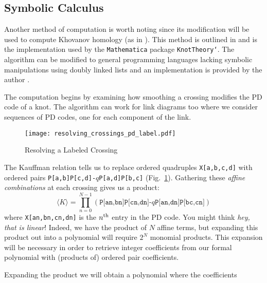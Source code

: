     \subsection{Symbolic Calculus}
        Another method of computation is worth noting since its modification
        will be used to compute Khovanov homology
        (as in \cite{BarNatan2006FASTKH}). This method is outlined in
        \cite{KatlasJones} and is the implementation used by the
        \texttt{Mathematica} package \texttt{KnotTheory`}. The algorithm
        can be modified to general programming languages lacking symbolic
        manipulations using doubly linked lists and an implementation
        is provided by the author \cite{MaguireJones}.
        \par\hfill\par
        The computation begins by examining how smoothing a crossing modifies
        the PD code of a knot. The algorithm can work for link diagrams too
        where we consider sequences of PD codes, one for each component of the
        link.
        \begin{figure}
            \centering
            \texttt{[image: resolving\_crossings\_pd\_label.pdf]}
            \caption{Resolving a Labeled Crossing}
            \label{fig:resolving_crossings_pd_label}
        \end{figure}
        The Kauffman relation tells us to replace ordered quadruples
        \texttt{X[a,b,c,d]} with ordered pairs
        \texttt{P[a,b]P[c,d]-$q$P[a,d]P[b,c]}
        (Fig.~\ref{fig:resolving_crossings_pd_label}).
        Gathering these \textit{affine combinations}
        at each crossing gives us a product:
        \begin{equation}
            \langle{K}\rangle
            =\prod_{n=0}^{N-1}(
                \texttt{P[an,bn]P[cn,dn]-$q$P[an,dn]P[bc,cn]}
            )
        \end{equation}
        where \texttt{X[an,bn,cn,dn]} is the
        $n^{\small\textrm{th}}$ entry in the PD code. You might think
        \textit{hey, that is linear}! Indeed, we have the product of
        $N$ affine terms, but expanding this product out into a polynomial
        will require $2^{N}$ monomial products. This expansion will be
        necessary in order to retrieve integer coefficients from our formal
        polynomial with (products of) ordered pair coefficients.
        \par\hfill\par
        Expanding the product we will obtain a polynomial where the coefficients
